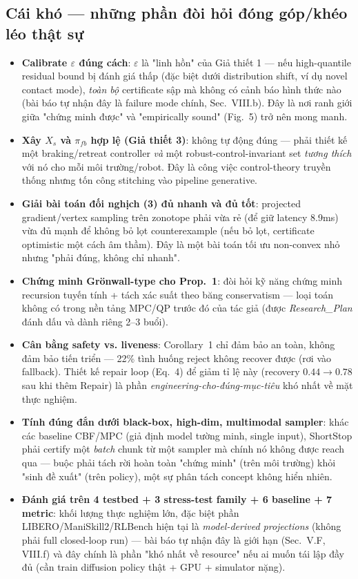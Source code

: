 \documentclass[a4paper,12pt]{article}
\begin{document}
\subsection{Cái khó --- những phần đòi hỏi đóng góp/khéo léo thật sự}
\begin{itemize}
  \item \textbf{Calibrate $\varepsilon$ đúng cách}: $\varepsilon$ là "linh hồn" của Giả thiết 1 --- nếu high-quantile residual bound bị đánh giá thấp (đặc biệt dưới distribution shift, ví dụ novel contact mode), \emph{toàn bộ} certificate sập mà không có cảnh báo hình thức nào (bài báo tự nhận đây là failure mode chính, Sec.~VIII.b). Đây là nơi ranh giới giữa "chứng minh được" và "empirically sound" (Fig.~5) trở nên mong manh.
  \item \textbf{Xây $X_s$ và $\pi_{fb}$ hợp lệ (Giả thiết 3)}: không tự động đúng --- phải thiết kế một braking/retreat controller \emph{và} một robust-control-invariant set \emph{tương thích} với nó cho mỗi môi trường/robot. Đây là công việc control-theory truyền thống nhưng tốn công stitching vào pipeline generative.
  \item \textbf{Giải bài toán đối nghịch (3) đủ nhanh và đủ tốt}: projected gradient/vertex sampling trên zonotope phải vừa rẻ (để giữ latency 8.9ms) vừa đủ mạnh để không bỏ lọt counterexample (nếu bỏ lọt, certificate optimistic một cách âm thầm). Đây là một bài toán tối ưu non-convex nhỏ nhưng "phải đúng, không chỉ nhanh".
  \item \textbf{Chứng minh Grönwall-type cho Prop.~1}: đòi hỏi kỹ năng chứng minh recursion tuyến tính + tách xác suất theo băng conservatism --- loại toán không có trong nền tảng MPC/QP trước đó của tác giả (được \emph{Research\_Plan} đánh dấu \new{} và dành riêng 2--3 buổi).
  \item \textbf{Cân bằng safety vs. liveness}: Corollary~1 chỉ đảm bảo an toàn, không đảm bảo tiến triển --- 22\% tình huống reject không recover được (rơi vào fallback). Thiết kế repair loop (Eq.~4) để giảm tỉ lệ này (recovery $0.44\to0.78$ sau khi thêm Repair) là phần \emph{engineering-cho-đúng-mục-tiêu} khó nhất về mặt thực nghiệm.
  \item \textbf{Tính đúng đắn dưới black-box, high-dim, multimodal sampler}: khác các baseline CBF/MPC (giả định model tường minh, single input), ShortStop phải certify một \emph{batch} chunk từ một sampler mà chính nó không được reach qua --- buộc phải tách rời hoàn toàn "chứng minh" (trên môi trường) khỏi "sinh đề xuất" (trên policy), một sự phân tách concept không hiển nhiên.
  \item \textbf{Đánh giá trên 4 testbed + 3 stress-test family + 6 baseline + 7 metric}: khối lượng thực nghiệm lớn, đặc biệt phần LIBERO/ManiSkill2/RLBench hiện tại là \emph{model-derived projections} (không phải full closed-loop run) --- bài báo tự nhận đây là giới hạn (Sec.~V.F, VIII.f) và đây chính là phần "khó nhất về resource" nếu ai muốn tái lập đầy đủ (cần train diffusion policy thật + GPU + simulator nặng).
\end{itemize}
\end{document}
